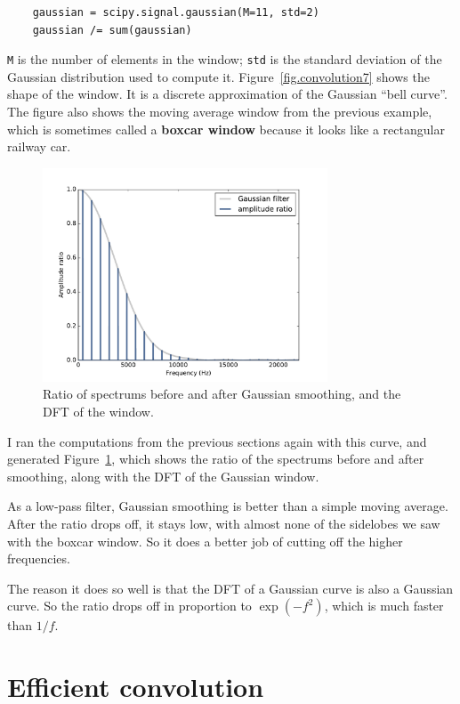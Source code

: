 \documentclass[12pt]{book}
\begin{document}
\begin{verbatim}
    gaussian = scipy.signal.gaussian(M=11, std=2)
    gaussian /= sum(gaussian)
\end{verbatim}

{\tt M} is the number of elements in the window; {\tt std}
is the standard deviation of the Gaussian distribution used to
compute it.  Figure~\ref{fig.convolution7} shows the shape
of the window.  It is a discrete approximation of the Gaussian
``bell curve''.  The figure also shows the moving average window
from the previous example, which is sometimes called a
{\bf boxcar window} because it looks like a rectangular railway car.

\begin{figure}
\centerline{\includegraphics[height=2.5in]{figs/convolution8.pdf}}
\caption{Ratio of spectrums before and after Gaussian smoothing, and
  the DFT of the window.}
\label{fig.convolution8}
\end{figure}

I ran the computations from the previous sections again
with this curve, and generated Figure~\ref{fig.convolution8},
which shows the ratio of the spectrums before and after
smoothing, along with the DFT of the Gaussian window.

As a low-pass filter, Gaussian smoothing is better than a simple
moving average.  After the ratio drops off, it stays low, with almost
none of the sidelobes we saw with the boxcar window.  So it does a
better job of cutting off the higher frequencies.

The reason it does so well is that the DFT of a Gaussian curve is also a
Gaussian curve.  So the ratio drops off in proportion to $\exp(-f^2)$,
which is much faster than $1/f$.


\section{Efficient convolution}
\label{effconv}
\end{document}
